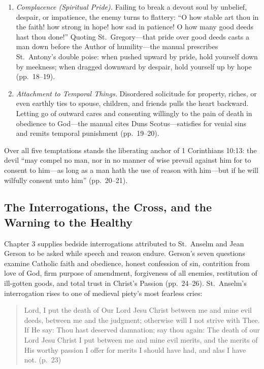 \begin{enumerate}
\item \emph{Complacence (Spiritual Pride).} Failing to break a devout soul by unbelief, despair, or impatience, the enemy turns to flattery: ``O how stable art thou in the faith! how strong in hope! how sad in patience! O how many good deeds hast thou done!'' Quoting St.\ Gregory---that pride over good deeds casts a man down before the Author of humility---the manual prescribes St.\ Antony's double poise: when pushed upward by pride, hold yourself down by meekness; when dragged downward by despair, hold yourself up by hope (pp.\ 18--19).

\item \emph{Attachment to Temporal Things.} Disordered solicitude for property, riches, or even earthly ties to spouse, children, and friends pulls the heart backward. Letting go of outward cares and consenting willingly to the pain of death in obedience to God---the manual cites Duns Scotus---satisfies for venial sins and remits temporal punishment (pp.\ 19--20).
\end{enumerate}

Over all five temptations stands the liberating anchor of 1 Corinthians 10:13: the devil ``may compel no man, nor in no manner of wise prevail against him for to consent to him---as long as a man hath the use of reason with him---but if he will wilfully consent unto him'' (pp.\ 20--21).

\subsection{The Interrogations, the Cross, and the Warning to the Healthy}

Chapter 3 supplies bedside interrogations attributed to St.\ Anselm and Jean Gerson to be asked while speech and reason endure. Gerson's seven questions examine Catholic faith and obedience, honest confession of sin, contrition from love of God, firm purpose of amendment, forgiveness of all enemies, restitution of ill-gotten goods, and total trust in Christ's Passion (pp.\ 24--26). St.\ Anselm's interrogation rises to one of medieval piety's most fearless cries:

\begin{quote}
Lord, I put the death of Our Lord Jesu Christ between me and mine evil deeds, between me and the judgment; otherwise will I not strive with Thee. If He say: Thou hast deserved damnation; say thou again: The death of our Lord Jesu Christ I put between me and mine evil merits, and the merits of His worthy passion I offer for merits I should have had, and alas I have not. (p.\ 23)
\end{quote}

